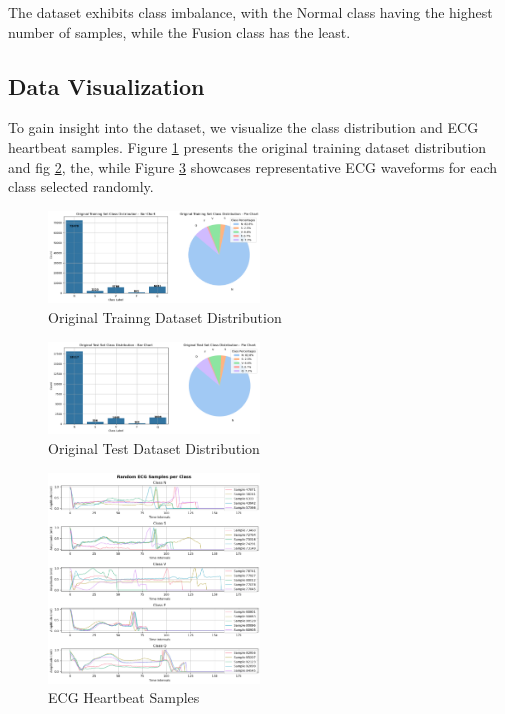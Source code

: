 The dataset exhibits class imbalance, with the Normal class having the highest number of samples, while the Fusion class has the least.

\subsection{Data Visualization}
To gain insight into the dataset, we visualize the class distribution and ECG heartbeat samples. Figure \ref{fig:original_trainset_distribution} presents the original training dataset distribution and fig \ref{fig:original_testset_distribution}, the, while Figure \ref{fig:ecg_samples} showcases representative ECG waveforms for each class selected randomly.

\begin{figure}[htbp]
    \centering
    \includegraphics[width=0.5\textwidth]{images/OriginalDatasetTrainingDistribution.png}
    \caption{Original Trainng Dataset Distribution}
    \label{fig:original_trainset_distribution}
\end{figure}

\begin{figure}[htbp]
    \centering
    \includegraphics[width=0.5\textwidth]{images/OriginalDatasetTestDistribution.png}
    \caption{Original Test Dataset Distribution}
    \label{fig:original_testset_distribution}
\end{figure}

\begin{figure}[htbp]
    \centering
    \includegraphics[width=0.5\textwidth]{images/RandomECGsamplesPerClass.png}
    \caption{ECG Heartbeat Samples}
    \label{fig:ecg_samples}
\end{figure}

